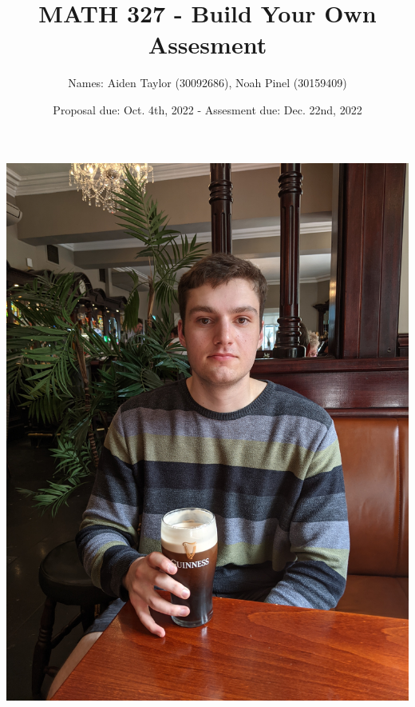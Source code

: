 \documentclass[11pt]{article}
\title{MATH 327 - Build Your Own Assesment}
\author{Names: Aiden Taylor (30092686), Noah Pinel (30159409)}
\date{Proposal due: Oct. 4th, 2022 - Assesment due: Dec. 22nd, 2022}
\begin{document}
\maketitle
\begin{center}
\includegraphics[scale=0.0536]{aiden}

\end{center}
\end{document}
